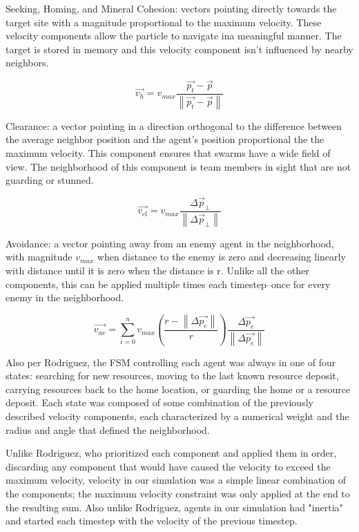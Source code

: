 \documentclass[12pt,journal,compsoc]{IEEEtran}
\begin{document}
Seeking, Homing, and Mineral Cohesion: vectors pointing directly towards the target site with a magnitude proportional to the maximum velocity. These velocity components allow the particle to navigate ina  meaningful manner. The target is stored in memory and this velocity component isn't influenced by nearby neighbors.

\begin{equation}
    \vec{v_h} = v_{max} \frac {\vec{p_t} - \vec p} { \left\| \vec{p_t} - \vec p \right\| }
    \label{eqn:seeking}
\end{equation}

Clearance: a vector pointing in a direction orthogonal to the difference between the average neighbor position and the agent's position proportional the the maximum velocity. This component ensures that swarms have a wide field of view. The neighborhood of this component is team members in sight that are not guarding or stunned.

\begin{equation}
    \vec{v_{cl}} = v_{max} \frac {\Delta \vec p_\perp } { \left\| \Delta \vec p_\perp  \right\| }
    \label{eqn:clearance}
\end{equation}

Avoidance: a vector pointing away from an enemy agent in the neighborhood, with magnitude $v_{max}$ when distance to the enemy is zero and decreasing linearly with distance until it is zero when the distance is r. Unlike all the other components, this can be applied multiple times each timestep--once for every enemy in the neighborhood.

\begin{equation}
    \vec { v_{ av } } =\sum _{i=0}^{n} {v_{ max } \left( \frac{r - \left\| \Delta \vec{p_e} \right\|} {r} \right) \frac { \Delta \vec { p_e }  }{ \left\| \Delta \vec { p_e }  \right\|  }}
    \label{eqn:avoidance}
\end{equation}

Also per Rodriguez, the FSM controlling each agent was always in one of four states: searching for new resources, moving to the last known resource deposit, carrying resources back to the home location, or guarding the home or a resource deposit. Each state was composed of some combination of the previously described velocity components, each characterized by a numerical weight and the radius and angle that defined the neighborhood.

Unlike Rodriguez, who prioritized each component and applied them in order, discarding any component that would have caused the velocity to exceed the maximum velocity, velocity in our simulation was a simple linear combination of the components; the maximum velocity constraint was only applied at the end to the resulting sum. Also unlike Rodriguez, agents in our simulation had "inertia" and started each timestep with the velocity of the previous timestep.
\end{document}
